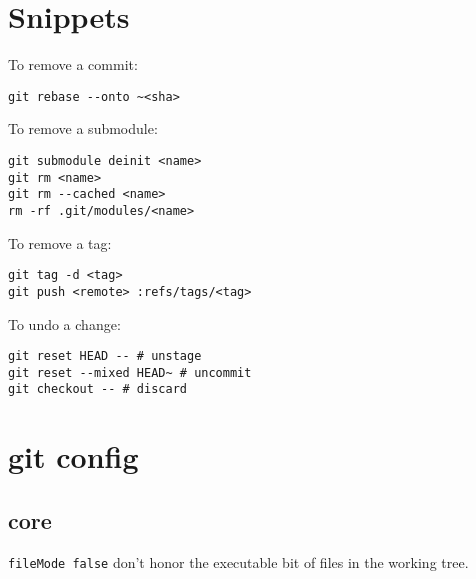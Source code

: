 \documentclass{reference_card}
\begin{document}
\begin{multicols*}{3}
\section*{Snippets}
To remove a commit:
\begin{verbatim}
git rebase --onto ~<sha>
\end{verbatim}

To remove a submodule:
\begin{verbatim}
git submodule deinit <name>
git rm <name>
git rm --cached <name>
rm -rf .git/modules/<name>
\end{verbatim}

To remove a tag:
\begin{verbatim}
git tag -d <tag>
git push <remote> :refs/tags/<tag>
\end{verbatim}

To undo a change:
\begin{verbatim}
git reset HEAD -- # unstage
git reset --mixed HEAD~ # uncommit
git checkout -- # discard
\end{verbatim}

\section*{git config}
\subsection*{core}
\texttt{fileMode false} don't honor the executable bit of files in the working tree.
\end{multicols*}
\end{document}
